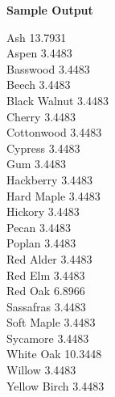 \begin{flushleft}
{\color{red} \textbf{Sample Output}}
\end{flushleft}
\begin{flushleft}
Ash 13.7931\\
Aspen 3.4483\\
Basswood 3.4483\\
Beech 3.4483\\
Black Walnut 3.4483\\
Cherry 3.4483\\
Cottonwood 3.4483\\
Cypress 3.4483\\
Gum 3.4483\\
Hackberry 3.4483\\
Hard Maple 3.4483\\
Hickory 3.4483\\
Pecan 3.4483\\
Poplan 3.4483\\
Red Alder 3.4483\\
Red Elm 3.4483\\
Red Oak 6.8966\\
Sassafras 3.4483\\
Soft Maple 3.4483\\
Sycamore 3.4483\\
White Oak 10.3448\\
Willow 3.4483\\
Yellow Birch 3.4483\\
\end{flushleft}

\newpage